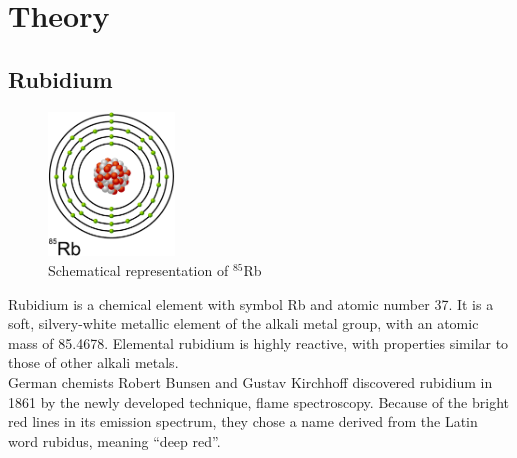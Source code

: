 
\chapter{Theory}  %
\pagebreak

\ifpdf{}
    \graphicspath{{Chapter2/Figs/Raster/}{Chapter2/Figs/PDF/}{Chapter2/Figs/}}
\else
    \graphicspath{{Chapter2/Figs/Vector/}{Chapter2/Figs/}}
\fi


\section{Rubidium} %

\begin{figure}[h]
\centering
\includegraphics[width=0.3\textwidth]{rubidium_atom}
\caption[Rubidium Atom]{Schematical representation of \(^{85}\)Rb}
\label{fig:Atom}
\end{figure}

\vspace{\fill}

Rubidium is a chemical element with symbol Rb and atomic number 37.
It is a soft, silvery-white metallic element of the alkali metal group, 
with an atomic mass of 85.4678. Elemental rubidium is highly reactive, with 
properties similar to those of other alkali metals.\\
German chemists Robert Bunsen and Gustav Kirchhoff discovered rubidium in 
1861 by the newly developed technique, flame spectroscopy.
Because of the bright red lines in its emission spectrum, they chose a name 
derived from the Latin word rubidus, meaning ``deep red''. \citep{bunsen}
\bigskip

